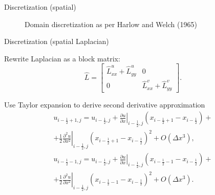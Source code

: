 \documentclass{beamer}
\begin{document}
	\begin{frame}{Discretization (spatial)}
		\begin{figure}[H] %
		\caption{Domain discretization as per Harlow and Welch (1965)}\label{bl-domain-discretization}
		\end{figure}
	\end{frame}
	
	\begin{frame}{Discretization (spatial Laplacian)}
	
	Rewrite Laplacian as a block matrix:
	\begin{equation*}
		\hat L=
		\begin{bmatrix}
	  \hat{L}^u_{xx}+\hat{L}^u_{yy} & 0 \\
	  0 & \hat{L}^v_{xx}+\hat{L}^v_{yy}
	\end{bmatrix}.
	\end{equation*}
	
	Use Taylor expansion to derive second derivative approximation
	\begin{multline}\label{eqn:Taylor right} 
		u_{i-\frac{1}{2}+1,j}=u_{i-\frac{1}{2},j}+\left.\frac{\partial u}{\partial x}\right|_{i-\frac{1}{2},j}\left(x_{i-\frac{1}{2}+1}-x_{i-\frac{1}{2}}\right)+\\
		+\frac{1}{2}\left.\frac{\partial^2 u}{\partial x^2}\right|_{i-\frac{1}{2},j}\left(x_{i-\frac{1}{2}+1}-x_{i-\frac{1}{2}}\right)^2+O\left(\Delta x^3\right),
	\end{multline}
	\begin{multline}\label{eqn:Taylor left} 
		u_{i-\frac{1}{2}-1,j}=u_{i-\frac{1}{2},j}+\left.\frac{\partial u}{\partial x}\right|_{i-\frac{1}{2},j}\left(x_{i-\frac{1}{2}-1}-x_{i-\frac{1}{2}}\right)+\\
		+\frac{1}{2}\left.\frac{\partial^2 u}{\partial x^2}\right|_{i-\frac{1}{2},j}\left(x_{i-\frac{1}{2}-1}-x_{i-\frac{1}{2}}\right)^2+O\left(\Delta x^3\right).
	\end{multline}
	\end{frame}
	
\end{document}
